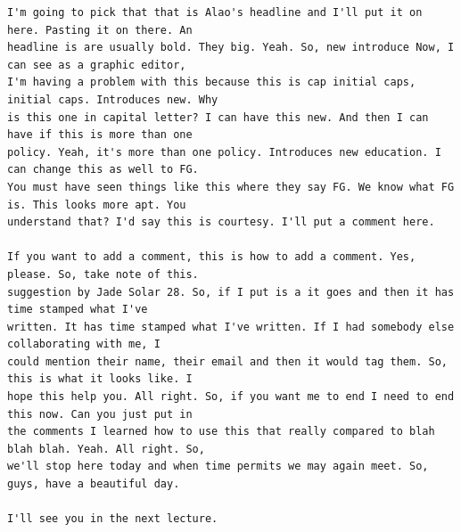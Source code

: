 {\begin{Verbatim}
I'm going to pick that that is Alao's headline and I'll put it on here. Pasting it on there. An
headline is are usually bold. They big. Yeah. So, new introduce Now, I can see as a graphic editor,
I'm having a problem with this because this is cap initial caps, initial caps. Introduces new. Why
is this one in capital letter? I can have this new. And then I can have if this is more than one
policy. Yeah, it's more than one policy. Introduces new education. I can change this as well to FG.
You must have seen things like this where they say FG. We know what FG is. This looks more apt. You
understand that? I'd say this is courtesy. I'll put a comment here.

If you want to add a comment, this is how to add a comment. Yes, please. So, take note of this.
suggestion by Jade Solar 28. So, if I put is a it goes and then it has time stamped what I've
written. It has time stamped what I've written. If I had somebody else collaborating with me, I
could mention their name, their email and then it would tag them. So, this is what it looks like. I
hope this help you. All right. So, if you want me to end I need to end this now. Can you just put in
the comments I learned how to use this that really compared to blah blah blah. Yeah. All right. So,
we'll stop here today and when time permits we may again meet. So, guys, have a beautiful day.

I'll see you in the next lecture.
\end{Verbatim}
}
